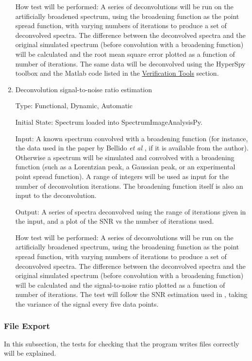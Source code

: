 \documentclass[12pt, titlepage]{article}
\newcommand{\progname}{SpectrumImageAnalysisPy}
\begin{document}
\begin{enumerate}
How test will be performed: A series of deconvolutions will be run on the
artificially broadened spectrum, using the broadening function as the point
spread function, with varying numbers of iterations to produce a set of
deconvolved spectra. The difference between the deconvolved spectra and the
original simulated spectrum (before convolution with a broadening function) will
be calculated and the root mean square error plotted as a function of number of
iterations. The same data will be deconvolved using the HyperSpy toolbox and the
Matlab code listed in the \hyperref[subsec:VerificationTools]{Verification
Tools} section.\\


\item{Deconvolution signal-to-noise ratio estimation}
\label{TFR:RLSNR}

Type: Functional, Dynamic, Automatic
					
Initial State: Spectrum loaded into \progname{}.

Input: A known spectrum convolved with a broadening function (for instance, the
data used in the paper by Bellido \textit{et al} \cite{bellido_toward_2014}, if
it is available from the author). Otherwise a spectrum will be simulated and
convolved with a broadening function (such as a Lorentzian peak, a Gaussian
peak, or an experimental point spread function). A range of integers will be
used as input for the number of deconvolution iterations. The broadening
function itself is also an input to the deconvolution.

Output: A series of spectra deconvolved using the range of iterations given in
the input, and a plot of the SNR vs the number of iterations used.
					
How test will be performed: A series of deconvolutions will be run on the
artificially broadened spectrum, using the broadening function as the point
spread function, with varying numbers of iterations to produce a set of
deconvolved spectra. The difference between the deconvolved spectra and the
original simulated spectrum (before convolution with a broadening function) will
be calculated and the signal-to-noise ratio plotted as a function of number of
iterations. The test will follow the SNR estimation used in
\cite{bellido_toward_2014}, taking the variance of the signal every five data
points.\\

\end{enumerate}

\subsubsection{File Export}
In this subsection, the tests for checking that the program writes files
correctly will be explained.
\end{document}
